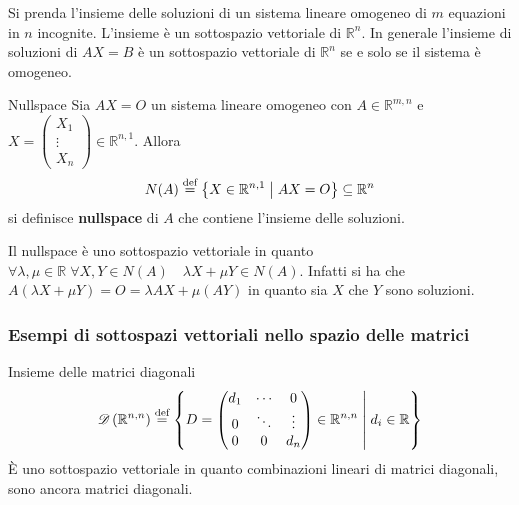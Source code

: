 Si prenda l'insieme delle soluzioni di un sistema lineare omogeneo di $m$ equazioni in
$n$ incognite. L'insieme è un sottospazio vettoriale di $\mathbb{R}^n$. In generale
l'insieme di soluzioni di $AX=B$ è un sottospazio vettoriale di $\mathbb{R}^n$ se e solo
se il sistema è omogeneo.

\begin{Def}{Nullspace}
  Sia $AX=O$ un sistema lineare omogeneo con $A\in\mathbb{R}^{m,n}$ e
  $X=
  \begin{pmatrix}
    X_1\\\vdots\\X_n
  \end{pmatrix}\in\mathbb{R}^{n,1}$. Allora
  \begin{equation*}
    N(A)\bydef \left\{ X\in\mathbb{R}^{n,1}\Setsuchthat AX = O
    \right\}\subseteq\mathbb{R}^n
  \end{equation*}
  si definisce \textbf{nullspace} di $A$ che contiene l'insieme delle soluzioni.
\end{Def}

Il nullspace è uno sottospazio vettoriale in quanto
$\forall\lambda,\mu\in\mathbb{R}\;\forall X,Y\in N(A)\quad \lambda X+\mu Y\in N(A)$.
Infatti si ha che $A(\lambda X+\mu Y) = O = \lambda AX+\mu (AY)$ in quanto sia $X$ che
$Y$ sono soluzioni.

\subsubsection{Esempi di sottospazi vettoriali nello spazio delle matrici}%
\label{sub:esempi_di_sottospazi_vettoriali_nello_spazio_dell_matrici}

\begin{Ex}{Insieme delle matrici diagonali}
  \begin{equation*}
    \mathscr{D}\left( \mathbb{R}^{n,n} \right) \bydef \left\{ D =
      \begin{pmatrix}
        d_1 & \cdots & 0\\
        0 & \ddots & \vdots\\
        0 & 0 & d_n
      \end{pmatrix}\in\mathbb{R}^{n,n}
      \Setsuchthat d_i\in\mathbb{R}
    \right\}
  \end{equation*}
  È uno sottospazio vettoriale in quanto combinazioni lineari di matrici diagonali, sono
  ancora matrici diagonali.
\end{Ex}

